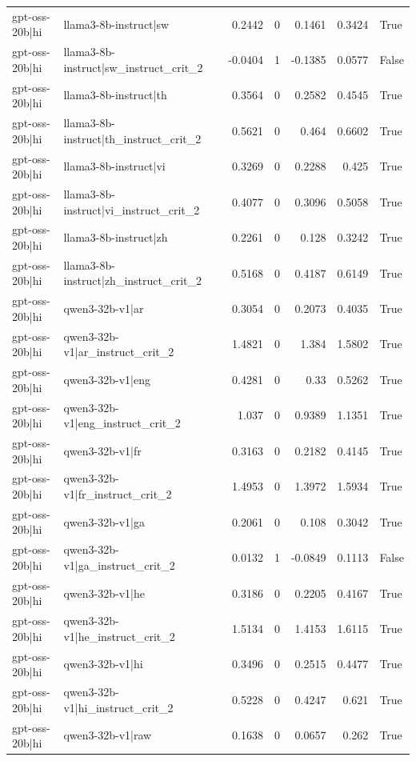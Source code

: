 \begin{table}
\begin{tabular}{l l r r r r l}
gpt-oss-20b|hi & llama3-8b-instruct|sw & 0.2442 & 0 & 0.1461 & 0.3424 & True \\
gpt-oss-20b|hi & llama3-8b-instruct|sw_instruct_crit_2 & -0.0404 & 1 & -0.1385 & 0.0577 & False \\
gpt-oss-20b|hi & llama3-8b-instruct|th & 0.3564 & 0 & 0.2582 & 0.4545 & True \\
gpt-oss-20b|hi & llama3-8b-instruct|th_instruct_crit_2 & 0.5621 & 0 & 0.464 & 0.6602 & True \\
gpt-oss-20b|hi & llama3-8b-instruct|vi & 0.3269 & 0 & 0.2288 & 0.425 & True \\
gpt-oss-20b|hi & llama3-8b-instruct|vi_instruct_crit_2 & 0.4077 & 0 & 0.3096 & 0.5058 & True \\
gpt-oss-20b|hi & llama3-8b-instruct|zh & 0.2261 & 0 & 0.128 & 0.3242 & True \\
gpt-oss-20b|hi & llama3-8b-instruct|zh_instruct_crit_2 & 0.5168 & 0 & 0.4187 & 0.6149 & True \\
gpt-oss-20b|hi & qwen3-32b-v1|ar & 0.3054 & 0 & 0.2073 & 0.4035 & True \\
gpt-oss-20b|hi & qwen3-32b-v1|ar_instruct_crit_2 & 1.4821 & 0 & 1.384 & 1.5802 & True \\
gpt-oss-20b|hi & qwen3-32b-v1|eng & 0.4281 & 0 & 0.33 & 0.5262 & True \\
gpt-oss-20b|hi & qwen3-32b-v1|eng_instruct_crit_2 & 1.037 & 0 & 0.9389 & 1.1351 & True \\
gpt-oss-20b|hi & qwen3-32b-v1|fr & 0.3163 & 0 & 0.2182 & 0.4145 & True \\
gpt-oss-20b|hi & qwen3-32b-v1|fr_instruct_crit_2 & 1.4953 & 0 & 1.3972 & 1.5934 & True \\
gpt-oss-20b|hi & qwen3-32b-v1|ga & 0.2061 & 0 & 0.108 & 0.3042 & True \\
gpt-oss-20b|hi & qwen3-32b-v1|ga_instruct_crit_2 & 0.0132 & 1 & -0.0849 & 0.1113 & False \\
gpt-oss-20b|hi & qwen3-32b-v1|he & 0.3186 & 0 & 0.2205 & 0.4167 & True \\
gpt-oss-20b|hi & qwen3-32b-v1|he_instruct_crit_2 & 1.5134 & 0 & 1.4153 & 1.6115 & True \\
gpt-oss-20b|hi & qwen3-32b-v1|hi & 0.3496 & 0 & 0.2515 & 0.4477 & True \\
gpt-oss-20b|hi & qwen3-32b-v1|hi_instruct_crit_2 & 0.5228 & 0 & 0.4247 & 0.621 & True \\
gpt-oss-20b|hi & qwen3-32b-v1|raw & 0.1638 & 0 & 0.0657 & 0.262 & True \\

\end{tabular}
\end{table}
